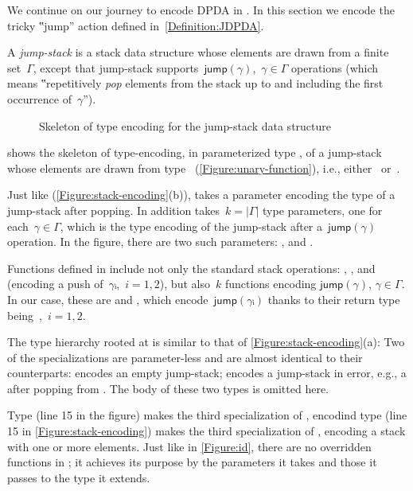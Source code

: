 We continue on our journey to encode DPDA in \Java.
In this section we encode the tricky ‟jump” action defined in~\cref{Definition:JDPDA}.

A \emph{jump-stack} is a stack data structure whose elements are drawn from a finite set~$Γ$,
  except that jump-stack supports~$\textsf{jump}(γ)$,~$γ∈Γ$ operations
  (which means ‟repetitively \emph{pop} elements from the stack up 
  to and including the first occurrence of~$γ$”).

\begin{wrapfigure}[18]{r}{42ex}
  \caption{Skeleton of type encoding for the jump-stack data structure}%
  \label{Figure:jump}%
  \lstset{style=numbered}
\end{wrapfigure}

 shows the skeleton of type-encoding, in parameterized type ,  
  of a jump-stack whose elements are drawn from type~
(\cref{Figure:unary-function}), i.e., either~ or~.

Just like  (\cref{Figure:stack-encoding}(b)),  takes 
  a  parameter encoding the type of a jump-stack after popping.
In addition  takes~$k=|Γ|$ type parameters, one for each~$γ∈Γ$,
  which is the type encoding of the jump-stack after a~$\textsf{jump}(γ)$
  operation.
In the figure, there are two such parameters: , and
  .

Functions defined in  include not only the standard stack operations: ,
,  and~ (encoding a push of~$γᵢ$,~$i=1,2$),
but also~$k$ functions encoding $\textsf{jump}(\gamma)$, $\gamma \in \Gamma$.
In our case, these are  and ,
  which encode~$\textsf{jump}(γᵢ)$
  thanks to their return type being~,~$i=1,2$.

The type hierarchy rooted at  is similar to that of
\cref{Figure:stack-encoding}(a):
Two of the specializations are parameter-less and are
  almost identical to their 
  counterparts:
 encodes an empty jump-stack;  encodes a jump-stack in error,
e.g., a after popping from .
The body of these two types is omitted here.

Type  (line 15 in the figure) makes the third specialization of , encodind
type  (line 15 in \cref{Figure:stack-encoding}) makes the third specialization of , encoding
  a stack with one or more elements.
Just like in \cref{Figure:id}, there are no overridden functions in ; it achieves
  its purpose by the parameters it takes and those it passes
  to the type it extends.

